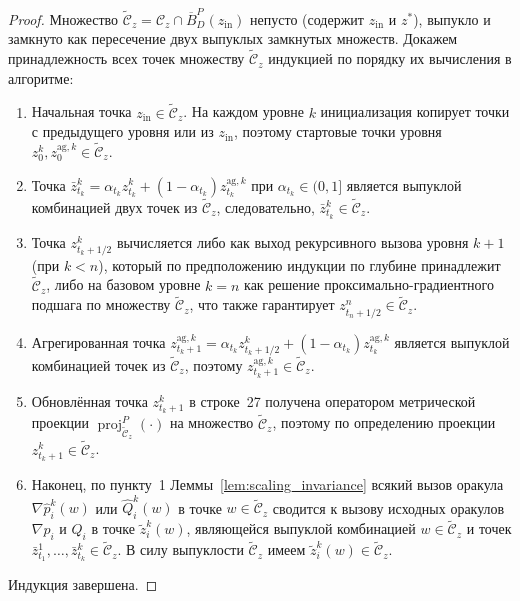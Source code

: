 \documentclass[11pt, a4paper]{article}
\theoremstyle{definition}
\begin{document}
\begin{proof}
Множество $\widetilde{\mathcal{C}}_z = \mathcal{C}_z \cap \overline{B}_D^P(z_{\mathrm{in}})$ непусто (содержит $z_{\mathrm{in}}$ и $z^*$), выпукло и замкнуто как пересечение двух выпуклых замкнутых множеств. Докажем принадлежность всех точек множеству $\widetilde{\mathcal{C}}_z$ индукцией по порядку их вычисления в алгоритме:
\begin{enumerate}
    \item Начальная точка $z_{\mathrm{in}} \in \widetilde{\mathcal{C}}_z$. На каждом уровне $k$ инициализация копирует точки с предыдущего уровня или из $z_{\mathrm{in}}$, поэтому стартовые точки уровня $z_0^k, z_0^{\mathrm{ag}, k} \in \widetilde{\mathcal{C}}_z$.
    \item Точка $\bar{z}_{t_k}^k = \alpha_{t_k} z_{t_k}^k + (1 - \alpha_{t_k}) z_{t_k}^{\mathrm{ag}, k}$ при $\alpha_{t_k} \in (0, 1]$ является выпуклой комбинацией двух точек из $\widetilde{\mathcal{C}}_z$, следовательно, $\bar{z}_{t_k}^k \in \widetilde{\mathcal{C}}_z$.
    \item Точка $z_{t_k + 1/2}^k$ вычисляется либо как выход рекурсивного вызова уровня $k + 1$ (при $k < n$), который по предположению индукции по глубине принадлежит $\widetilde{\mathcal{C}}_z$, либо на базовом уровне $k = n$ как решение проксимально-градиентного подшага по множеству $\widetilde{\mathcal{C}}_z$, что также гарантирует $z_{t_n + 1/2}^n \in \widetilde{\mathcal{C}}_z$.
    \item Агрегированная точка $z_{t_k + 1}^{\mathrm{ag}, k} = \alpha_{t_k} z_{t_k + 1/2}^k + (1 - \alpha_{t_k}) z_{t_k}^{\mathrm{ag}, k}$ является выпуклой комбинацией точек из $\widetilde{\mathcal{C}}_z$, поэтому $z_{t_k + 1}^{\mathrm{ag}, k} \in \widetilde{\mathcal{C}}_z$.
    \item Обновлённая точка $z_{t_k + 1}^k$ в строке~27 получена оператором метрической проекции $\operatorname{proj}_{\widetilde{\mathcal{C}}_z}^P(\cdot)$ на множество $\widetilde{\mathcal{C}}_z$, поэтому по определению проекции $z_{t_k + 1}^k \in \widetilde{\mathcal{C}}_z$.
    \item Наконец, по пункту~1 Леммы~\ref{lem:scaling_invariance} всякий вызов оракула $\nabla \hat{p}_i^k(w)$ или $\hat{Q}_i^k(w)$ в точке $w \in \widetilde{\mathcal{C}}_z$ сводится к вызову исходных оракулов $\nabla p_i$ и $Q_i$ в точке $\tilde{z}_i^k(w)$, являющейся выпуклой комбинацией $w \in \widetilde{\mathcal{C}}_z$ и точек $\bar{z}_{t_1}^1, \dots, \bar{z}_{t_k}^k \in \widetilde{\mathcal{C}}_z$. В силу выпуклости $\widetilde{\mathcal{C}}_z$ имеем $\tilde{z}_i^k(w) \in \widetilde{\mathcal{C}}_z$.
\end{enumerate}
Индукция завершена.
\end{proof}
\end{document}
